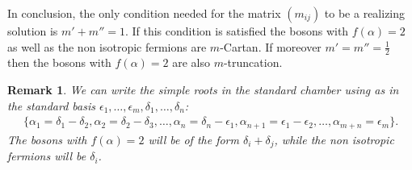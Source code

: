 \documentclass[10pt,a4paper]{amsart}
\numberwithin{equation}{section}
\newtheorem{oss}[teo]{Remark} }
\begin{document}
In conclusion, the only condition needed for the matrix $(m_{ij})$ to be a realizing solution is $m' + m'' = 1$. If this condition is satisfied the bosons with $f(\alpha)=2$ as well as the non isotropic fermions are $m$-Cartan. If moreover $m'=m''=\frac{1}{2}$ then the bosons with $f(\alpha)=2$ are also $m$-truncation.

\begin{oss} We can write the simple roots in the standard chamber using as in~\cite{Kac77} the standard basis $\epsilon_1, \dots, \epsilon_{m}, \delta_1, \dots, \delta_{n}$:
\begin{gather*}
 \{ \alpha_1 = \delta_1-\delta_2,  \alpha_2= \delta_2-\delta_3, \dots,  \alpha_{n}= \delta_n-\epsilon_{1},
  \alpha_{n+1}=\epsilon_1-\epsilon_2, \dots, \alpha_{m+n}=\epsilon_m \}.
\end{gather*}
The bosons with $f(\alpha)=2$ will be of the form $\delta_i+\delta_j$, while the non isotropic fermions will be $\delta_i$.
\end{oss}
\end{document}
